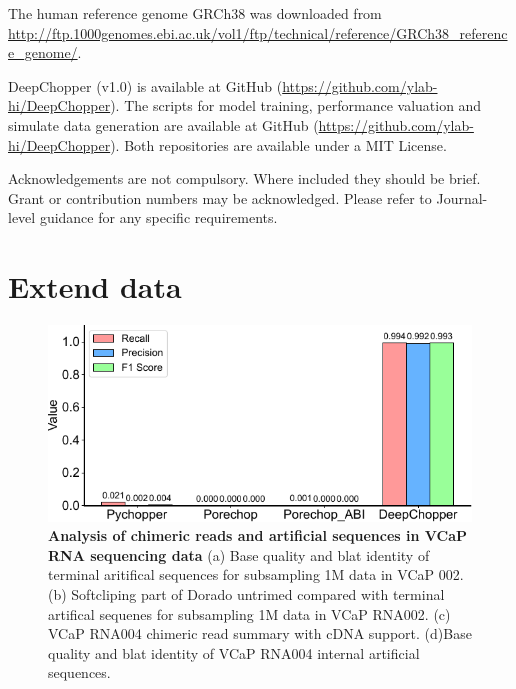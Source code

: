 \documentclass[pdflatex, sn-mathphys-num, lineno]{sn-jnl}%
\theoremstyle{thmstyleone}%
\theoremstyle{thmstyletwo}%
\theoremstyle{thmstylethree}%
\begin{document}

The human reference genome GRCh38 was downloaded from \url{http://ftp.1000genomes.ebi.ac.uk/vol1/ftp/technical/reference/GRCh38\_reference\_genome/}.



DeepChopper (v1.0) is available at GitHub (\url{https://github.com/ylab-hi/DeepChopper}).
The scripts for model training, performance valuation and simulate data generation are available at GitHub (\url{https://github.com/ylab-hi/DeepChopper}).
Both repositories are available under a MIT License.


Acknowledgements are not compulsory. Where included they should be brief. Grant or contribution numbers may be acknowledged.
Please refer to Journal-level guidance for any specific requirements.


\backmatter

\begin{appendices}
    \printglossary[type=\acronymtype, title=Abbreviations]

\end{appendices}






\newpage

\section{Extend data}

\renewcommand{\figurename}{Extended Data Fig.}


 \begin{figure}[!h]
     \includegraphics[height=0.65\columnwidth]{figures/finals/sf1}
     \caption{ {\bf Analysis of chimeric reads and artificial sequences in VCaP RNA sequencing data } (a) Base quality and \gls{blat} identity of terminal aritifical sequences for subsampling 1M data in VCaP 002. (b) Softcliping part of Dorado untrimed compared with terminal artifical sequenes for subsampling 1M data in VCaP RNA002. (c) VCaP RNA004 chimeric read summary with cDNA support. (d)Base quality and \gls{blat} identity of VCaP RNA004 internal artificial sequences.}
     \label{fig:sf1}
 \end{figure}
\end{document}
